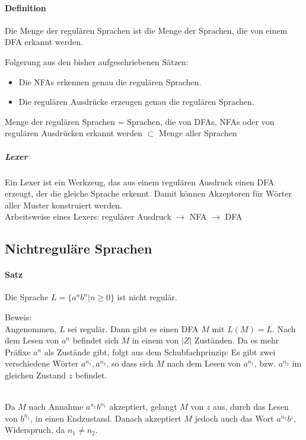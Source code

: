 \documentclass[a4paper]{scrartcl}
\begin{document}
\paragraph{Definition} Die Menge der regulären Sprachen ist die Menge der Sprachen, die von einem DFA erkannt werden.

Folgerung aus den bisher aufgeschriebenen Sätzen:\\
\begin{itemize}
\item Die NFAs erkennen genau die regulären Sprachen.
\item Die regulären Ausdrücke erzeugen genau die regulären Sprachen. 
\end{itemize}
Menge der regulären Sprachen = Sprachen, die von DFAs, NFAs oder von regulären Ausdrücken erkannt werden $\subset$ Menge aller Sprachen

\subparagraph{Lexer} Ein Lexer ist ein Werkzeug, das aus einem regulären Ausdruck einen DFA erzeugt, der die gleiche Sprache erkennt. Damit können Akzeptoren für Wörter aller Muster konstruiert werden.\\
Arbeitsweise eines Lexers:
regulärer Ausdruck $\rightarrow$ NFA $\rightarrow$ DFA

\subsection{Nichtreguläre Sprachen}
\paragraph{Satz} Die Sprache $L= \{a^nb^n | n \geq 0 \}$ ist nicht regulär.

Beweis:\\
Angenommen, $L$ sei regulär. Dann gibt es einen DFA $M$ mit $L(M) = L$. Nach dem Lesen von $a^n$ befindet sich $M$ in einem von $\lvert Z \rvert$ Zuständen. Da es mehr Präfixe $a^n$ als Zustände gibt, folgt aus dem Schubfachprinzip: Es gibt zwei verschiedene Wörter $a^{n_1},a^{n_2}$, so dass sich $M$ nach dem Lesen von $a^{n_1}$, bzw. $a^{n_2}$ im gleichen Zustand $z$ befindet.\\
\\
Da $M$ nach Annahme $a^{n_1} b^{n_1}$ akzeptiert, gelangt $M$ von $z$ aus, durch das Lesen von $b^{n_1}$, in einen Endzustand. Danach akzeptiert $M$ jedoch auch das Wort $a^{n_2}b^{_1}$, Widerspruch, da $n_1 \neq n_2$. 
\end{document}
